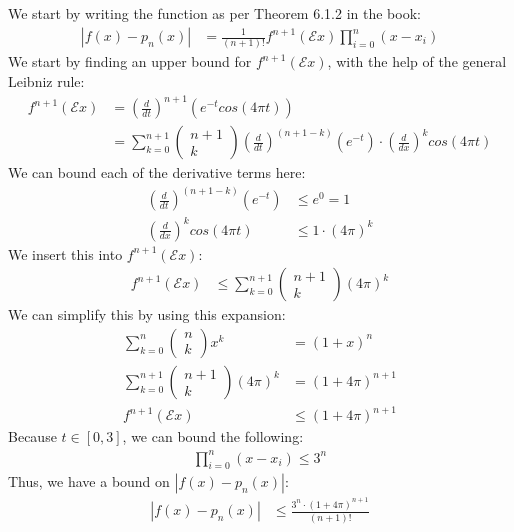 \subsection{}
We start by writing the function as per Theorem 6.1.2 in the book:
\begin{align*}
  |f(x) - p_n(x)| &= \frac{1}{(n+1)!} f^{n+1}(\mathcal{E}x)\prod^n_{i=0}(x-x_i)
\end{align*}
We start by finding an upper bound for $f^{n+1}(\mathcal{E}x)$, with the help of the general Leibniz rule:
\begin{align*}
  f^{n+1}(\mathcal{E}x) &= \left(\frac{d}{dt}\right)^{n+1} (e^{-t} cos(4\pi t)) \\
  &= \sum^{n+1}_{k=0} \begin{pmatrix} n+1 \\ k \end{pmatrix} \left(\frac{d}{dt}\right)^{(n+1-k)}(e^{-t}) \cdot \left(\frac{d}{dx}\right)^k cos(4\pi t)
\end{align*}
We can bound each of the derivative terms here:
\begin{align*}
  \left(\frac{d}{dt}\right)^{(n+1-k)}(e^{-t}) &\leq e^0 = 1 \\
  \left(\frac{d}{dx}\right)^k cos(4\pi t) &\leq 1 \cdot (4\pi)^k
\end{align*}
We insert this into $f^{n+1}(\mathcal{E}x)$:
\begin{align*}
  f^{n+1}(\mathcal{E}x) &\leq \sum^{n+1}_{k=0} \begin{pmatrix} n+1 \\ k \end{pmatrix} (4\pi)^k
\end{align*}
We can simplify this by using this expansion:
\begin{align*}
  \sum_{k=0}^n \begin{pmatrix} n \\ k \end{pmatrix} x^k &= (1 + x)^n \\
  \sum^{n+1}_{k=0} \begin{pmatrix} n+1 \\ k \end{pmatrix} (4\pi)^k &= (1 + 4\pi)^{n+1} \\
  f^{n+1}(\mathcal{E}x) &\leq (1 + 4\pi)^{n+1}
\end{align*}
Because $t \in [0,3]$, we can bound the following:
\begin{align*}
  \prod_{i=0}^n(x-x_i) \leq 3^n
\end{align*}
Thus, we have a bound on $|f(x) - p_n(x)|$:
\begin{align*}
  |f(x) - p_n(x)| &\leq \frac{3^n \cdot (1 + 4\pi)^{n+1}}{(n+1)!}
\end{align*}
